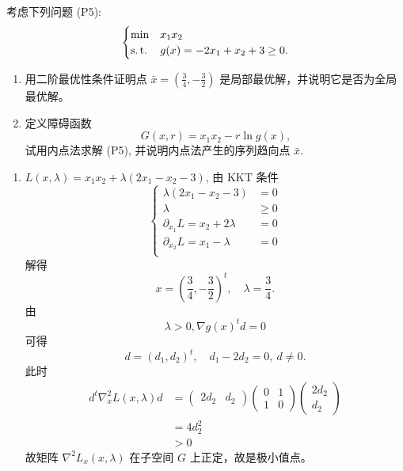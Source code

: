 \begin{Problem}
    考虑下列问题 (P5):
    \[\begin{cases}
        \min &x_1x_2\\
        \operatorname{s.t.} &g(x) = -2x_1 + x_2 + 3 \ge 0.
    \end{cases}\]
    \begin{enumerate}
        \item 用二阶最优性条件证明点 $\bar{x} = \left(\frac{3}{4}, -\frac{3}{2}\right)$ 是局部最优解，并说明它是否为全局最优解。
        \item 定义障碍函数 \[G(x, r) = x_1x_2 - r\ln g(x)\text{,}\] 试用内点法求解 (P5), 并说明内点法产生的序列趋向点 $\bar{x}$.
    \end{enumerate}

    \Answer \text{}
    \begin{enumerate}
        \item $L(x, \lambda) = x_1x_2 + \lambda(2x_1 - x_2 - 3)$, 由 KKT 条件
        \[\begin{cases}
            \lambda(2x_1 - x_2 - 3) &= 0\\
            \lambda &\ge 0\\
            \partial_{x_1}L = x_2 + 2\lambda &= 0\\
            \partial_{x_2}L = x_1 - \lambda &= 0\\
        \end{cases}\]
        解得 
        \[x = \left(\frac{3}{4}, -\frac{3}{2}\right)^t, \quad \lambda = \dfrac{3}{4}.\]
        由 \[\lambda > 0, \nabla g(x)^td = 0\]
        可得 
        \[d = (d_1, d_2)^t, \quad  d_1 - 2d_2 = 0,\ d \neq 0.\] 
        此时 
        \begin{align*}
            d^t\nabla^2_xL(x, \lambda)d &= \begin{pmatrix}
                2d_2 & d_2
            \end{pmatrix} \begin{pmatrix}
                0 & 1 \\ 1 & 0
            \end{pmatrix} \begin{pmatrix}
                2d_2 \\ d_2
            \end{pmatrix}\\
            &=4d_2^2\\
            &> 0
        \end{align*} 
        故矩阵 $\nabla^2L_x(x, \lambda)$ 在子空间 $G$ 上正定，故是极小值点。


\end{enumerate}
\end{Problem}

